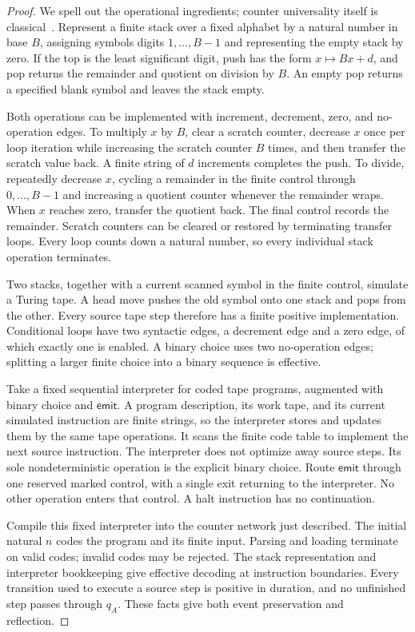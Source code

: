 \documentclass[11pt,letterpaper]{article}
\theoremstyle{definition}
\theoremstyle{remark}
\newcommand{\EMIT}{\mathsf{emit}}
\newcommand{\1}{\mathbf 1}
\begin{document}
\begin{proof}
We spell out the operational ingredients; counter universality itself is
classical~\cite{shepherdson-sturgis}. Represent a finite stack over a fixed
alphabet by a natural number in base $B$, assigning symbols digits
$1,\ldots,B-1$ and representing the empty stack by zero. If the top is the
least significant digit, push has the form $x\mapsto Bx+d$, and pop returns
the remainder and quotient on division by $B$. An empty pop returns a
specified blank symbol and leaves the stack empty.

Both operations can be implemented with increment, decrement, zero, and
no-operation edges. To multiply $x$ by $B$, clear a scratch counter, decrease
$x$ once per loop iteration while increasing the scratch counter $B$ times,
and then transfer the scratch value back. A finite string of $d$ increments
completes the push. To divide, repeatedly decrease $x$, cycling a remainder
in the finite control through $0,\ldots,B-1$ and increasing a quotient
counter whenever the remainder wraps. When $x$ reaches zero, transfer the
quotient back. The final control records the remainder. Scratch counters
can be cleared or restored by terminating transfer loops. Every loop counts
down a natural number, so every individual stack operation terminates.

Two stacks, together with a current scanned symbol in the finite control,
simulate a Turing tape. A head move pushes the old symbol onto one stack and
pops from the other. Every source tape step therefore has a finite positive
implementation. Conditional loops have two syntactic edges, a decrement
edge and a zero edge, of which exactly one is enabled. A binary choice uses
two no-operation edges; splitting a larger finite choice into a binary
sequence is effective.

Take a fixed sequential interpreter for coded tape programs, augmented with
binary choice and $\EMIT$. A program description, its work tape, and its
current simulated instruction are finite strings, so the interpreter stores
and updates them by the same tape operations. It scans the finite code table
to implement the next source instruction. The interpreter does not optimize
away source steps. Its sole nondeterministic operation is the explicit
binary choice. Route $\EMIT$ through one reserved marked control, with a
single exit returning to the interpreter. No other operation enters that
control. A halt instruction has no continuation.

Compile this fixed interpreter into the counter network just described.
The initial natural $n$ codes the program and its finite input. Parsing and
loading terminate on valid codes; invalid codes may be rejected. The stack
representation and interpreter bookkeeping give effective decoding at
instruction boundaries. Every transition used to execute a source step is
positive in duration, and no unfinished step passes through $q_A$. These
facts give both event preservation and reflection.
\end{proof}
\end{document}
